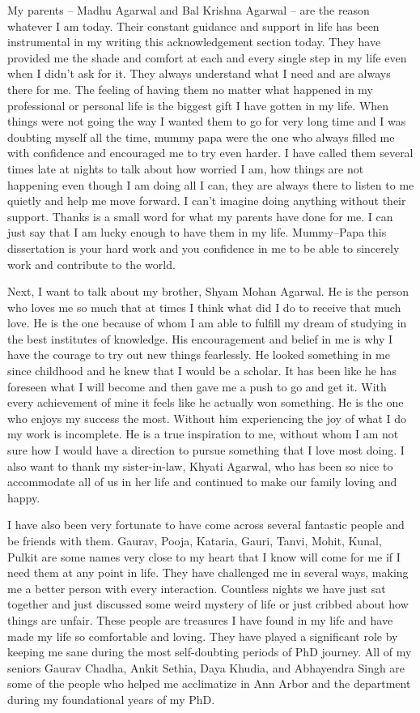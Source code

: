 My parents -- Madhu Agarwal and Bal Krishna Agarwal -- are the reason whatever I
am today. Their constant guidance and support in life has been instrumental in
my writing this acknowledgement section today. They have provided me the shade
and comfort at each and every single step in my life even when I didn't ask for
it. They always understand what I need and are always there for me. The feeling
of having them no matter what happened in my professional or personal life is
the biggest gift I have gotten in my life. When things were not going the way I
wanted them to go for very long time and I was doubting myself all the time,
mummy papa were the one who always filled me with confidence and encouraged me
to try even harder. I have called them several times late at nights to talk about
how worried I am, how things are not happening even though I am doing all I can,
they are always there to listen to me quietly and help me move forward. I can't
imagine doing anything without their support. Thanks is a small word for what my
parents have done for me. I can just say that I am lucky enough to have them in
my life. Mummy--Papa this dissertation is your hard work and you confidence in
me to be able to sincerely work and contribute to the world.

Next, I want to talk about my brother, Shyam Mohan Agarwal. He is the person who
loves me so much that at times I think what did I do to receive that much love.
He is the one because of whom I am able to fulfill my dream of studying in
the best institutes of knowledge. His encouragement and belief in me is why I
have the courage to try out new things fearlessly. He looked something in me
since childhood and he knew that I would be a scholar. It has been like he has
foreseen what I will become and then gave me a push to go and get it. With every
achievement of mine it feels like he actually won something. He is the one who
enjoys my success the most. Without him experiencing the joy of what I do my
work is incomplete. He is a true inspiration to me, without whom I am not sure
how I would have a direction to pursue something that I love most doing. I also
want to thank my sister-in-law, Khyati Agarwal, who has been so nice to
accommodate all of us in her life and continued to make our family loving and
happy.

I have also been very fortunate to have come across several fantastic people and be
friends with them. Gaurav, Pooja, Kataria, Gauri, Tanvi, Mohit, Kunal, Pulkit
are some names very close to my heart that I know will come for me if I need
them at any point in life. They have challenged me in several ways, making me a
better person with every interaction. Countless nights we have just sat together
and just discussed some weird mystery of life or just cribbed about how things
are unfair. These people are treasures I have found in my life and have made my
life so comfortable and loving. They have played a significant role by keeping
me sane during the most self-doubting periods of PhD journey. All of my seniors
Gaurav Chadha, Ankit Sethia, Daya Khudia, and Abhayendra Singh are some of the
people who helped me acclimatize in Ann Arbor and the department during my
foundational years of my PhD.

